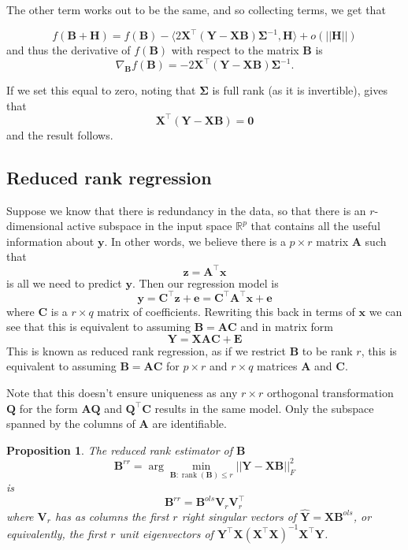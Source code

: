 \documentclass[
]{book}
\newtheorem{proposition}{Proposition}[chapter]
\theoremstyle{definition}
\theoremstyle{definition}
\theoremstyle{definition}
\theoremstyle{definition}
\theoremstyle{remark}
\begin{document}
The other term works out to be the same, and so collecting terms, we get that

\[f(\mathbf B+\mathbf H) =f(\mathbf B)- \langle 2\mathbf X^\top (\mathbf Y-\mathbf X\mathbf B)\boldsymbol{\Sigma}^{-1}, \mathbf H\rangle +o(||\mathbf H||)\]
and thus the derivative of \(f(\mathbf B)\) with respect to the matrix \(\mathbf B\) is
\[\nabla_{\mathbf B}f(\mathbf B)= -2\mathbf X^\top (\mathbf Y-\mathbf X\mathbf B)\boldsymbol{\Sigma}^{-1}.\]

If we set this equal to zero, noting that \(\boldsymbol{\Sigma}\) is full rank (as it is invertible), gives that
\[\mathbf X^\top (\mathbf Y-\mathbf X\mathbf B)=\boldsymbol 0\]
and the result follows.

\hypertarget{reduced-rank-regression}{%
\subsection{Reduced rank regression}\label{reduced-rank-regression}}

Suppose we know that there is redundancy in the data, so that there is an \(r\)-dimensional active subspace in the input space \(\mathbb{R}^p\) that contains all the useful information about \(\mathbf y\). In other words, we believe there is a \(p \times r\) matrix \(\mathbf A\) such that
\[\mathbf z=\mathbf A^\top\mathbf x\]
is all we need to predict \(\mathbf y\). Then our regression model is
\[\mathbf y= \mathbf C^\top \mathbf z+ \mathbf e= \mathbf C^\top \mathbf A^\top \mathbf x+ \mathbf e\]
where \(\mathbf C\) is a \(r\times q\) matrix of coefficients. Rewriting this back in terms of \(\mathbf x\) we can see that this is
equivalent to assuming \(\mathbf B= \mathbf A\mathbf C\) and in matrix form
\[\mathbf Y= \mathbf X\mathbf A\mathbf C+ \mathbf E\]
This is known as reduced rank regression, as if we restrict \(\mathbf B\) to be rank \(r\), this is equivalent to assuming \(\mathbf B= \mathbf A\mathbf C\) for \(p\times r\) and \(r \times q\) matrices \(\mathbf A\) and \(\mathbf C\).

Note that this doesn't ensure uniqueness as any \(r \times r\) orthogonal transformation \(\mathbf Q\) for the form \(\mathbf A\mathbf Q\) and \(\mathbf Q^\top \mathbf C\) results in the same model. Only the subspace spanned by the columns of \(\mathbf A\) are identifiable.

\begin{proposition}
\protect\hypertarget{prp:unnamed-chunk-12}{}{\label{prp:unnamed-chunk-12} }The reduced rank estimator of \(\mathbf B\) \[\mathbf B^{rr} = 
\arg \min_{\mathbf B: \operatorname{rank}(\mathbf B)\leq r} ||\mathbf Y-\mathbf X\mathbf B||_F^2\]
is \[\mathbf B^{rr}=\mathbf B^{ols}\mathbf V_r \mathbf V_r^\top\]
where \(\mathbf V_r\) has as columns the first \(r\) right singular vectors of \(\hat{\mathbf Y}=\mathbf X\mathbf B^{ols}\), or equivalently, the first \(r\) unit eigenvectors of \(\mathbf Y^\top \mathbf X(\mathbf X^\top \mathbf X)^{-1}\mathbf X^\top \mathbf Y\).
\end{proposition}
\end{document}
